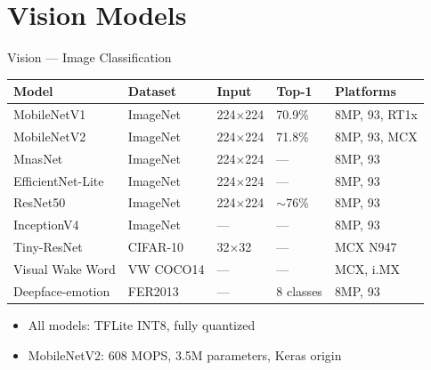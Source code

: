 \documentclass[aspectratio=169]{beamer}
\begin{document}
\section{Vision Models}

\begin{frame}{Vision — Image Classification}
  \centering\small
  \begin{tabular}{lllll}
    \toprule
    \textbf{Model} & \textbf{Dataset} & \textbf{Input} & \textbf{Top-1} & \textbf{Platforms} \\
    \midrule
    MobileNetV1      & ImageNet   & 224$\times$224 & \alert{70.9\%} & 8MP, 93, RT1x \\
    MobileNetV2      & ImageNet   & 224$\times$224 & \alert{71.8\%} & 8MP, 93, MCX \\
    MnasNet          & ImageNet   & 224$\times$224 & ---            & 8MP, 93 \\
    EfficientNet-Lite& ImageNet   & 224$\times$224 & ---            & 8MP, 93 \\
    ResNet50         & ImageNet   & 224$\times$224 & \alert{$\sim$76\%} & 8MP, 93 \\
    InceptionV4      & ImageNet   & ---            & ---            & 8MP, 93 \\
    Tiny-ResNet      & CIFAR-10   & 32$\times$32   & ---            & MCX N947 \\
    Visual Wake Word & VW COCO14  & ---            & ---            & MCX, i.MX \\
    Deepface-emotion & FER2013    & ---            & 8 classes      & 8MP, 93 \\
    \bottomrule
  \end{tabular}
  \vspace{4pt}
  \begin{itemize}\small
    \item All models: TFLite INT8, fully quantized
    \item MobileNetV2: \alert{608 MOPS}, 3.5M parameters, Keras origin
  \end{itemize}
\end{frame}
\end{document}
